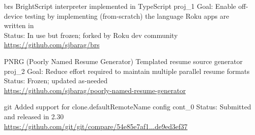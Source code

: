 \documentclass[10pt]{barag_resume}
\begin{document}
    \begin{project}
        {brs}
        {BrightScript interpreter implemented in TypeScript}
        {proj_1}
            Goal: Enable off-device testing by implementing (from-scratch) the language Roku apps are written in\\
            Status: In use but frozen; forked by Roku dev community \\ 
            \url{https://github.com/sjbarag/brs}
    \end{project}

    \begin{project}
        {PNRG (Poorly Named Resume Generator)}
        {Templated resume source generator}
        {proj_2}
            Goal: Reduce effort required to maintain multiple parallel resume formats\\
            Status: Frozen; updated as-needed \\ 
            \url{https://github.com/sjbarag/poorly-named-resume-generator}
    \end{project}


\relax
    \begin{project}
        {git}
        {Added support for clone.defaultRemoteName config}
        {cont_0}
            Status: Submitted and released in 2.30\\
            \url{https://github.com/git/git/compare/54e85e7af1...de9ed3ef37}
    \end{project}
\end{document}
